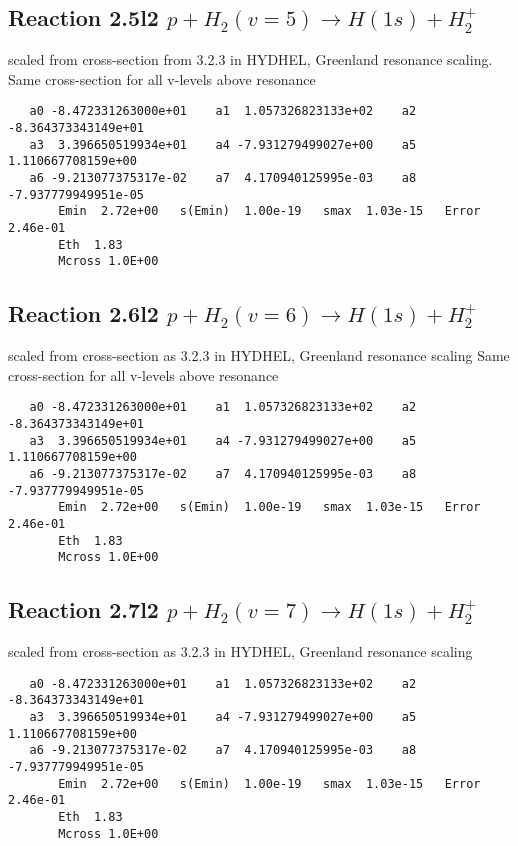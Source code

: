 \documentclass[12pt,dvipdfmx]{article}
\begin{document}
\subsection{
Reaction 2.5l2 $   p + H_2(v=5) \rightarrow H(1s) + H_2^+$}

scaled from cross-section from 3.2.3 in HYDHEL, Greenland resonance scaling.
Same cross-section for all v-levels above resonance

\begin{small}\begin{verbatim}
   a0 -8.472331263000e+01    a1  1.057326823133e+02    a2 -8.364373343149e+01
   a3  3.396650519934e+01    a4 -7.931279499027e+00    a5  1.110667708159e+00
   a6 -9.213077375317e-02    a7  4.170940125995e-03    a8 -7.937779949951e-05
       Emin  2.72e+00   s(Emin)  1.00e-19   smax  1.03e-15   Error  2.46e-01
       Eth  1.83
       Mcross 1.0E+00
\end{verbatim}\end{small}

\subsection{
Reaction 2.6l2 $   p + H_2(v=6) \rightarrow H(1s) + H_2^+$}

scaled from cross-section as 3.2.3 in HYDHEL, Greenland resonance scaling
Same cross-section for all v-levels above resonance

\begin{small}\begin{verbatim}
   a0 -8.472331263000e+01    a1  1.057326823133e+02    a2 -8.364373343149e+01
   a3  3.396650519934e+01    a4 -7.931279499027e+00    a5  1.110667708159e+00
   a6 -9.213077375317e-02    a7  4.170940125995e-03    a8 -7.937779949951e-05
       Emin  2.72e+00   s(Emin)  1.00e-19   smax  1.03e-15   Error  2.46e-01
       Eth  1.83
       Mcross 1.0E+00
\end{verbatim}\end{small}

\subsection{
Reaction 2.7l2 $   p + H_2(v=7) \rightarrow H(1s) + H_2^+$}

scaled from cross-section as 3.2.3 in HYDHEL, Greenland resonance scaling

\begin{small}\begin{verbatim}
   a0 -8.472331263000e+01    a1  1.057326823133e+02    a2 -8.364373343149e+01
   a3  3.396650519934e+01    a4 -7.931279499027e+00    a5  1.110667708159e+00
   a6 -9.213077375317e-02    a7  4.170940125995e-03    a8 -7.937779949951e-05
       Emin  2.72e+00   s(Emin)  1.00e-19   smax  1.03e-15   Error  2.46e-01
       Eth  1.83
       Mcross 1.0E+00
\end{verbatim}\end{small}
\end{document}
